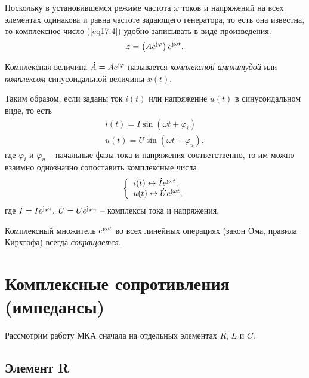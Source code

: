     Поскольку в установившемся режиме частота \( \omega \) токов и напряжений
    на всех элементах одинакова и равна частоте задающего генератора, то есть
    она известна, то комплексное число (\ref{eq17:4}) удобно записывать в виде
    произведения:
    \[
        z = \left(Ae^{\mathrm{j}\varphi}\right)e^{\mathrm{j}\omega t}.
    \]
    
    \begin{definition}
        Комплексная величина \( \dot{A} = Ae^{\mathrm{j}\varphi} \) называется
        \textit{комплексной амплитудой} или \textit{комплексом} синусоидальной
        величины \( x(t) \).
    \end{definition}
    
    Таким образом, если заданы ток \( i(t) \) или напряжение \( u(t) \) в
    синусоидальном виде, то есть
    \[
        \begin{array}{l}
            i(t) = I\sin(\omega t + \varphi_i) \\
            u(t) = U\sin(\omega t + \varphi_u),
        \end{array}
    \]
    где \( \varphi_i \) и \( \varphi_u \) -- начальные фазы тока и напряжения
    соответственно, то им можно взаимно однозначно сопоставить комплексные
    числа
    \begin{equation}
        \left\{
            \begin{array}{l}
                i(t) \leftrightarrow \dot{I}e^{\mathrm{j}\omega t}, \\
                u(t) \leftrightarrow \dot{U}e^{\mathrm{j}\omega t},
            \end{array}
        \right.
        \label{eq17:5}
    \end{equation}
    где \( \dot{I} = Ie^{\mathrm{j}\varphi_i} \),
    \( \dot{U} = Ue^{\mathrm{j}\varphi_u} \) -- комплексы тока и напряжения.
    
    Комплексный множитель \( e^{\mathrm{j}\omega t} \) во всех линейных операциях 
    (закон Ома, правила Кирхгофа) всегда \textit{сокращается}.
    
\section{Комплексные сопротивления (импедансы)}

    Рассмотрим работу МКА сначала на отдельных элементах \( R \), \( L \) и
    \( C \).
    
    \subsection{Элемент R}
        
